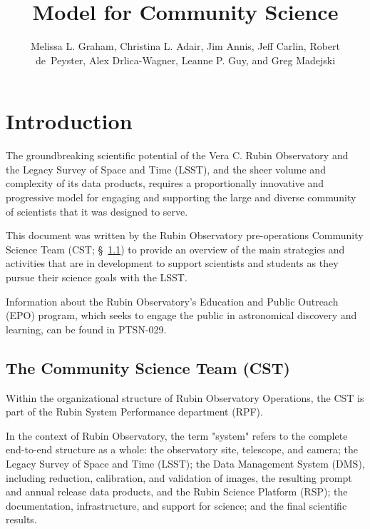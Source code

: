 \documentclass[DM,authoryear,toc]{lsstdoc}
\title{Model for Community Science}
\author{%
Melissa L. Graham, Christina L. Adair, Jim Annis, Jeff Carlin, Robert de~Peyster, Alex Drlica-Wagner, Leanne P. Guy, and Greg Madejski
}
\date{\vcsDate}
\begin{document}
\maketitle



\section{Introduction}\label{sec:intro}

The groundbreaking scientific potential of the Vera C. Rubin Observatory and the Legacy Survey of Space and Time (LSST), and the sheer volume and complexity of its data products, requires a proportionally innovative and progressive model for engaging and supporting the large and diverse community of scientists that it was designed to serve. 

This document was written by the Rubin Observatory pre-operations Community Science Team (CST; \S~\ref{sec:intro_org}) to provide an overview of the main strategies and activities that are in development to support scientists and students as they pursue their science goals with the LSST. 

Information about the Rubin Observatory's Education and Public Outreach (EPO) program, which seeks to engage the public in astronomical discovery and learning, can be found in PTSN-029. %


\subsection{The Community Science Team (CST)}\label{sec:intro_org}

Within the organizational structure of Rubin Observatory Operations, the CST is part of the Rubin System Performance department (RPF).

In the context of Rubin Observatory, the term "system" refers to the complete end-to-end structure as a whole: the observatory site, telescope, and camera; the Legacy Survey of Space and Time (LSST); the Data Management System (DMS), including reduction, calibration, and validation of images, the resulting prompt and annual release data products, and the Rubin Science Platform (RSP); the documentation, infrastructure, and support for science; and the final scientific results. 
\end{document}
